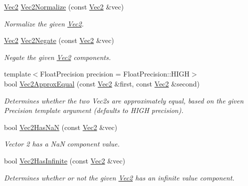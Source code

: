 \begin{DoxyCompactItemize}
\hyperlink{classgofxmath_1_1_vec2}{Vec2} \hyperlink{group___s_i_s_d_vec_math_gaa0125e18e221531bfc7d72d47cdf42d9}{Vec2\+Normalize} (const \hyperlink{classgofxmath_1_1_vec2}{Vec2} \&vec)
\begin{DoxyCompactList}\small\item\em Normalize the given \hyperlink{classgofxmath_1_1_vec2}{Vec2}. \end{DoxyCompactList}\item 
\hyperlink{classgofxmath_1_1_vec2}{Vec2} \hyperlink{group___s_i_s_d_vec_math_ga55959c707ef1b444eb2d71009a201aa2}{Vec2\+Negate} (const \hyperlink{classgofxmath_1_1_vec2}{Vec2} \&vec)
\begin{DoxyCompactList}\small\item\em Negate the given \hyperlink{classgofxmath_1_1_vec2}{Vec2} components. \end{DoxyCompactList}\item 
{\footnotesize template$<$Float\+Precision precision = Float\+Precision\+::\+H\+I\+G\+H$>$ }\\bool \hyperlink{group___s_i_s_d_vec_math_gae2e5df24e56917013fefa17579bb8749}{Vec2\+Approx\+Equal} (const \hyperlink{classgofxmath_1_1_vec2}{Vec2} \&first, const \hyperlink{classgofxmath_1_1_vec2}{Vec2} \&second)
\begin{DoxyCompactList}\small\item\em Determines whether the two Vec2s are approximately equal, based on the given Precision template argument (defaults to H\+I\+G\+H precision). \end{DoxyCompactList}\item 
bool \hyperlink{group___s_i_s_d_vec_math_ga7b340b1e4dd88d99aba27f41cd0c1d17}{Vec2\+Has\+Na\+N} (const \hyperlink{classgofxmath_1_1_vec2}{Vec2} \&vec)
\begin{DoxyCompactList}\small\item\em Vector 2 has a Na\+N component value. \end{DoxyCompactList}\item 
bool \hyperlink{group___s_i_s_d_vec_math_ga6eb96a6532361189c7cacdbd9ae95c90}{Vec2\+Has\+Infinite} (const \hyperlink{classgofxmath_1_1_vec2}{Vec2} \&vec)
\begin{DoxyCompactList}\small\item\em Determines whether or not the given \hyperlink{classgofxmath_1_1_vec2}{Vec2} has an infinite value component. \end{DoxyCompactList}\end{DoxyCompactItemize}



